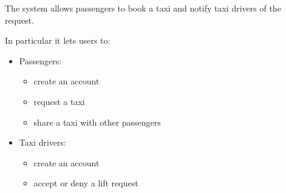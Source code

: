 The system allows passengers to book a taxi and notify taxi drivers of the request.

In particular it lets users to:
\begin{itemize}
\item Passengers:
    \begin{itemize}
    \item create an account
    \item request a taxi
    \item share a taxi with other passengers
    \end{itemize}
\item Taxi drivers:
    \begin{itemize}
    \item create an account
    \item accept or deny a lift request
    \end{itemize}
\end{itemize}
